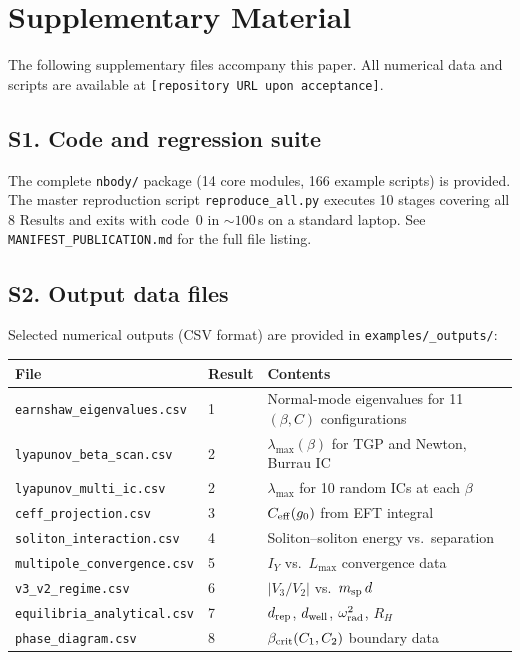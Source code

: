 
\section*{Supplementary Material}

The following supplementary files accompany this paper.
All numerical data and scripts are available at
\texttt{[repository URL upon acceptance]}.

\subsection*{S1. Code and regression suite}

The complete \texttt{nbody/} package (14 core modules, 166 example
scripts) is provided.  The master reproduction script
\texttt{reproduce\_all.py} executes 10 stages covering all 8 Results
and exits with code~0 in ${\sim}100$\,s on a standard laptop.
See \texttt{MANIFEST\_PUBLICATION.md} for the full file listing.

\subsection*{S2. Output data files}

Selected numerical outputs (CSV format) are provided in
\texttt{examples/\_outputs/}:

\begin{center}\small
\begin{tabular}{@{}llp{7cm}@{}}
\toprule
\textbf{File} & \textbf{Result} & \textbf{Contents} \\
\midrule
\texttt{earnshaw\_eigenvalues.csv} & 1 & Normal-mode eigenvalues for 11 $(\beta,C)$ configurations \\
\texttt{lyapunov\_beta\_scan.csv} & 2 & $\lambda_{\max}(\beta)$ for TGP and Newton, Burrau IC \\
\texttt{lyapunov\_multi\_ic.csv} & 2 & $\lambda_{\max}$ for 10 random ICs at each $\beta$ \\
\texttt{ceff\_projection.csv} & 3 & $C_{\rm eff}(g_0)$ from EFT integral \\
\texttt{soliton\_interaction.csv} & 4 & Soliton--soliton energy vs.\ separation \\
\texttt{multipole\_convergence.csv} & 5 & $I_Y$ vs.\ $L_{\max}$ convergence data \\
\texttt{v3\_v2\_regime.csv} & 6 & $|V_3/V_2|$ vs.\ $m_{\rm sp}\,d$ \\
\texttt{equilibria\_analytical.csv} & 7 & $d_{\rm rep}$, $d_{\rm well}$, $\omega_{\rm rad}^2$, $R_H$ \\
\texttt{phase\_diagram.csv} & 8 & $\beta_{\rm crit}(C_1, C_2)$ boundary data \\
\bottomrule
\end{tabular}
\end{center}

